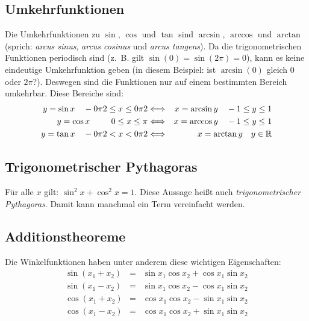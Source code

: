 \subsection{Umkehrfunktionen}%
Die Umkehrfunktionen zu $\sin$, $\cos$ und $\tan$ sind $\arcsin$, $\arccos$
und $\arctan$ (sprich: \emph{arcus sinus}, \emph{arcus cosinus} und
\emph{arcus tangens}). Da die trigonometrischen Funktionen periodisch sind
(z.~B. gilt $\sin(0) = \sin(2\pi)=0$), kann es keine eindeutige Umkehrfunktion
geben (in diesem Beispiel: ist $\arcsin(0)$ gleich $0$ oder $2\pi$?).
Deswegen sind die Funktionen nur auf einem bestimmten Bereich umkehrbar.
Diese Bereiche sind:
\begin{eqnarray*}
y = \sin x\quad -\pitwo \leq x \leq \pitwo &
\Longleftrightarrow &
x = \arcsin y \quad -1 \leq y \leq 1 \\
y = \cos x\quad \phantom{--}0 \leq x \leq \pi &
\Longleftrightarrow &
x = \arccos y \quad -1 \leq y \leq 1\\
y = \tan x\quad -\pitwo < x < \pitwo &
\Longleftrightarrow &
x = \arctan y \quad y\in \mathbb{R}
\end{eqnarray*}

\subsection{Trigonometrischer Pythagoras}
Für alle $x$ gilt: $\sin^2 x + \cos^2 x = 1$. Diese Aussage heißt auch
\emph{trigonometrischer Pythagoras}. Damit kann manchmal ein Term vereinfacht
werden.

\subsection{Additionstheoreme}
Die Winkelfunktionen haben unter anderem diese wichtigen Eigenschaften:
\begin{eqnarray*}
 \sin(x_1 + x_2) &=& \sin x_1 \cos x_2 + \cos x_1 \sin x_2\\
 \sin(x_1 - x_2) &=& \sin x_1 \cos x_2 - \cos x_1 \sin x_2\\
 \cos(x_1 + x_2) &=& \cos x_1 \cos x_2 - \sin x_1 \sin x_2\\
 \cos(x_1 - x_2) &=& \cos x_1 \cos x_2 + \sin x_1 \sin x_2\\
\end{eqnarray*}

